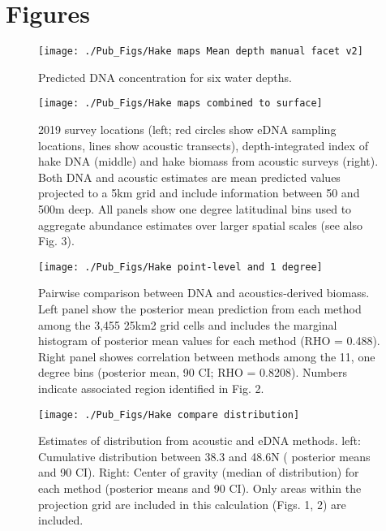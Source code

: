 \documentclass[
]{article}
\begin{document}
\newpage
\clearpage

\hypertarget{figures}{%
\section{Figures}\label{figures}}

\begin{figure}
\texttt{[image: ./Pub\_Figs/Hake maps Mean depth manual facet v2]} \caption{\label{fig:mean.maps} Predicted DNA concentration for six water depths. }\label{fig:fig.mean.maps}
\end{figure}

\begin{figure}
\texttt{[image: ./Pub\_Figs/Hake maps combined to surface]} \caption{\label{fig:surface.compare} 2019 survey locations (left; red circles show eDNA sampling locations, lines show acoustic transects), depth-integrated  index of hake DNA (middle) and hake biomass from acoustic surveys (right).  Both DNA and acoustic estimates are mean predicted values projected to a 5km grid and include information between 50 and 500m deep. All panels show one degree latitudinal bins used to aggregate abundance estimates over larger spatial scales (see also Fig. 3).    }\label{fig:fig.surface.compare}
\end{figure}

\begin{figure}
\texttt{[image: ./Pub\_Figs/Hake point-level and 1 degree]} \caption{\label{fig:pairwise} Pairwise comparison between  DNA and acoustics-derived biomass. Left panel show the posterior mean prediction from each method among the 3,455 25km2 grid cells and includes the marginal histogram of posterior mean values for each method (RHO = 0.488).  Right panel showes correlation between methods among the 11, one degree bins (posterior mean, 90 CI; RHO = 0.8208). Numbers indicate associated region identified in Fig. 2.  }\label{fig:fig.pairwise}
\end{figure}

\clearpage

\begin{figure}
\texttt{[image: ./Pub\_Figs/Hake compare distribution]} \caption{\label{fig:COG} Estimates of distribution from acoustic and eDNA methods. left: Cumulative distribution between 38.3 and 48.6N ( posterior means and 90 CI). Right: Center of gravity (median of distribution) for each method (posterior means and 90 CI).  Only areas within the projection grid are included in this calculation (Figs. 1, 2) are included.}\label{fig:fig.COG}
\end{figure}
\end{document}
